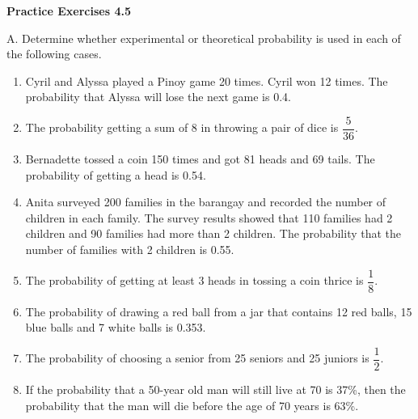 \vspace{0.3ex}
\noindent\textbf{Practice Exercises 4.5}

\vspace{0.2ex}

A. Determine whether experimental or theoretical probability is used in each of the following cases.  
\begin{enumerate} 
\item Cyril and Alyssa played a Pinoy game 20 times. Cyril won 12 times. The probability that Alyssa will lose the next game is 0.4.
\item The probability getting a sum of 8 in throwing a pair of dice is $\dfrac{5}{36}$. 
\item Bernadette tossed a coin 150 times and got 81 heads and 69 tails. The probability of getting a head is 0.54.
\item Anita surveyed 200 families in the barangay and recorded the number of children in each family. The survey results showed that 110 families had 2 children and 90 families had more than 2 children. The probability that the number of families with 2 children is 0.55.
\item The probability of getting at least 3 heads in tossing a coin thrice is $\dfrac{1}{8}$. 
\item The probability of drawing a red ball from a jar that contains 12 red balls, 15 blue balls and 7 white balls is 0.353.
\item The probability of choosing a senior from 25 seniors and 25 juniors is $\dfrac{1}{2} $. 
\item If the probability that a 50-year old man will still live at 70 is 37\%, then the probability that the man will die before the age of 70 years is 63\%.
\end{enumerate}

